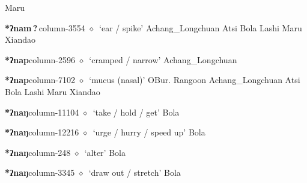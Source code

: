 \hspace{1ex}
         Maru 
  \item {\footnotesize \textbf{*ʔnam\,?\,}}{\tiny column-3554}
         $\diamond$~`ear / spike'
         Achang\_Longchuan 
\hspace{1ex}
         Atsi 
\hspace{1ex}
         Bola 
\hspace{1ex}
         Lashi 
\hspace{1ex}
         Maru 
\hspace{1ex}
         Xiandao 
  \item {\footnotesize \textbf{*ʔnap}}{\tiny column-2596}
         $\diamond$~`cramped / narrow'
         Achang\_Longchuan 
  \item {\footnotesize \textbf{*ʔnap}}{\tiny column-7102}
         $\diamond$~`mucus (nasal)'
         OBur. 
\hspace{1ex}
         Rangoon 
\hspace{1ex}
         Achang\_Longchuan 
\hspace{1ex}
         Atsi 
\hspace{1ex}
         Bola 
\hspace{1ex}
         Lashi 
\hspace{1ex}
         Maru 
\hspace{1ex}
         Xiandao 
  \item {\footnotesize \textbf{*ʔnaŋ}}{\tiny column-11104}
         $\diamond$~`take / hold / get'
         Bola 
  \item {\footnotesize \textbf{*ʔnaŋ}}{\tiny column-12216}
         $\diamond$~`urge / hurry / speed up'
         Bola 
  \item {\footnotesize \textbf{*ʔnaŋ}}{\tiny column-248}
         $\diamond$~`alter'
         Bola 
  \item {\footnotesize \textbf{*ʔnaŋ}}{\tiny column-3345}
         $\diamond$~`draw out / stretch'
         Bola 
